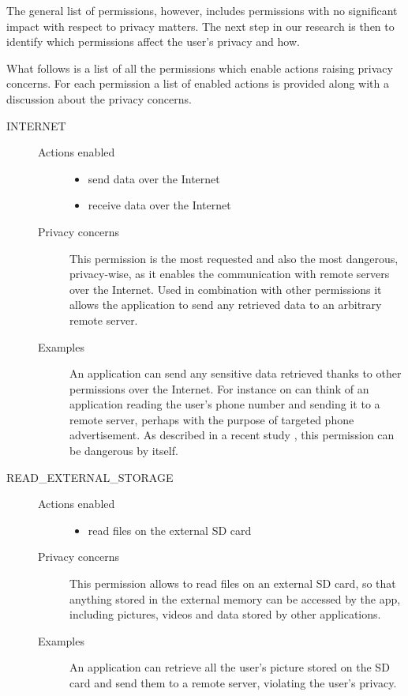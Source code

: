 \documentclass[twoside,letterpaper]{soups}
\theoremstyle{definition}
\begin{document}
The general list of permissions, however, includes permissions with no significant impact with respect to privacy matters. The next step in our research is then to identify which permissions affect the user's privacy and how.

What follows is a list of all the permissions which enable actions raising privacy concerns. For each permission a list of enabled actions is provided along with a discussion about the privacy concerns.

\begin{description}
    \item[INTERNET] \hfill
        \begin{description}
             \item[Actions enabled] \hfill
                \begin{itemize}
                     \item send data over the Internet
                     \item receive data over the Internet
                 \end{itemize} 
             \item[Privacy concerns]
                This permission is the most requested and also the most dangerous, privacy-wise, as it enables the communication with remote servers over the Internet.
                Used in combination with other permissions it allows the application to send any retrieved data to an arbitrary remote server.
             \item[Examples]
                An application can send any sensitive data retrieved thanks to other permissions over the Internet. For instance on can think of an application reading the user's phone number and sending it to a remote server, perhaps with the purpose of targeted phone advertisement.
                As described in a recent study \cite{stickley}, this permission can be dangerous by itself.
         \end{description} 
   
   \item[READ\_EXTERNAL\_STORAGE] \hfill
        \begin{description}
             \item[Actions enabled] \hfill
                \begin{itemize}
                     \item read files on the external SD card
                 \end{itemize} 
             \item[Privacy concerns]
                This permission allows to read files on an external SD card, so that anything stored in the external memory can be accessed by the app, including pictures, videos and data stored by other applications.
             \item[Examples]
                An application can retrieve all the user's picture stored on the SD card and send them to a remote server, violating the user's privacy.
         \end{description} 
    

\end{description}
\end{document}

